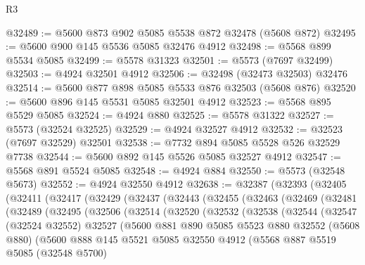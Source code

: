 \begin{lexlean}{R3}
\begin{coremodule}
@32489 := @5600 @873 @902 @5085 @5538 @872 @32478 (@5608 @872)
@32495 := @5600 @900 @145 @5536 @5085 @32476 @4912
@32498 := @5568 @899 @5534 @5085
@32499 := @5578 @31323
@32501 := @5573 (@7697 @32499)
@32503 := @4924 @32501 @4912
@32506 := @32498 (@32473 @32503) @32476
@32514 := @5600 @877 @898 @5085 @5533 @876 @32503 (@5608 @876)
@32520 := @5600 @896 @145 @5531 @5085 @32501 @4912
@32523 := @5568 @895 @5529 @5085
@32524 := @4924 @880
@32525 := @5578 @31322
@32527 := @5573 (@32524 @32525)
@32529 := @4924 @32527 @4912
@32532 := @32523 (@7697 @32529) @32501
@32538 := @7732 @894 @5085 @5528 @526 @32529 @7738
@32544 := @5600 @892 @145 @5526 @5085 @32527 @4912
@32547 := @5568 @891 @5524 @5085
@32548 := @4924 @884
@32550 := @5573 (@32548 @5673)
@32552 := @4924 @32550 @4912
@32638 := @32387
    (@32393
      (@32405
        (@32411
          (@32417
            (@32429
              (@32437
                (@32443
                  (@32455
                    (@32463
                      (@32469
                        (@32481
                          (@32489
                            (@32495
                              (@32506
                                (@32514
                                  (@32520
                                    (@32532
                                      (@32538
                                        (@32544
                                          (@32547
                                            (@32524 @32552)
                                            @32527
                                            (@5600
                                              @881
                                              @890
                                              @5085
                                              @5523
                                              @880
                                              @32552
                                              (@5608 @880)
                                              (@5600
                                                @888
                                                @145
                                                @5521
                                                @5085
                                                @32550
                                                @4912
                                                (@5568
                                                  @887
                                                  @5519
                                                  @5085
                                                  (@32548 @5700)

\end{coremodule}
\end{lexlean}

